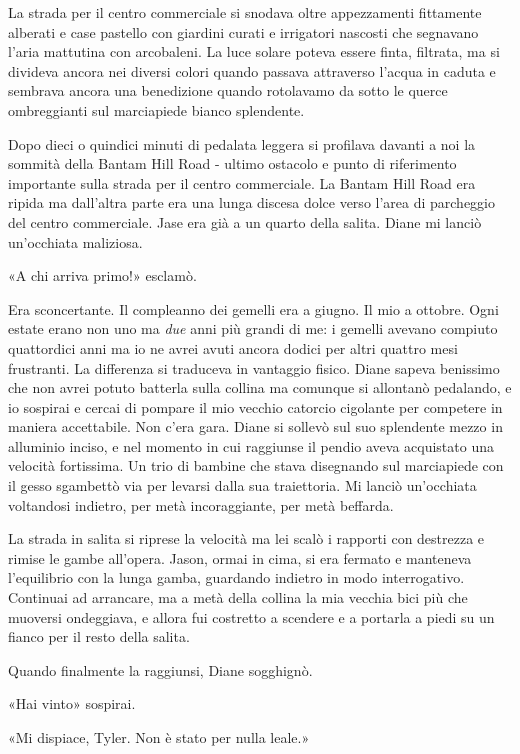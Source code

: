 La strada per il centro commerciale si snodava oltre appezzamenti
fittamente alberati e case pastello con giardini curati e irrigatori
nascosti che segnavano l'aria mattutina con arcobaleni. La luce solare
poteva essere finta, filtrata, ma si divideva ancora nei diversi colori
quando passava attraverso l'acqua in caduta e sembrava ancora una
benedizione quando rotolavamo da sotto le querce ombreggianti sul
marciapiede bianco splendente.

Dopo dieci o quindici minuti di pedalata leggera si profilava davanti a
noi la sommità della Bantam Hill Road - ultimo ostacolo e punto di
riferimento importante sulla strada per il centro commerciale. La Bantam
Hill Road era ripida ma dall'altra parte era una lunga discesa dolce
verso l'area di parcheggio del centro commerciale. Jase era già a un
quarto della salita. Diane mi lanciò un'occhiata maliziosa.

«A chi arriva primo!» esclamò.

Era sconcertante. Il compleanno dei gemelli era a giugno. Il mio a
ottobre. Ogni estate erano non uno ma \emph{due} anni più grandi di me:
i gemelli avevano compiuto quattordici anni ma io ne avrei avuti ancora
dodici per altri quattro mesi frustranti. La differenza si traduceva in
vantaggio fisico. Diane sapeva benissimo che non avrei potuto batterla
sulla collina ma comunque si allontanò pedalando, e io sospirai e cercai
di pompare il mio vecchio catorcio cigolante per competere in maniera
accettabile. Non c'era gara. Diane si sollevò sul suo splendente mezzo
in alluminio inciso, e nel momento in cui raggiunse il pendio aveva
acquistato una velocità fortissima. Un trio di bambine che stava
disegnando sul marciapiede con il gesso sgambettò via per levarsi dalla
sua traiettoria. Mi lanciò un'occhiata voltandosi indietro, per metà
incoraggiante, per metà beffarda.

La strada in salita si riprese la velocità ma lei scalò i rapporti con
destrezza e rimise le gambe all'opera. Jason, ormai in cima, si era
fermato e manteneva l'equilibrio con la lunga gamba, guardando indietro
in modo interrogativo. Continuai ad arrancare, ma a metà della collina
la mia vecchia bici più che muoversi ondeggiava, e allora fui costretto
a scendere e a portarla a piedi su un fianco per il resto della salita.

Quando finalmente la raggiunsi, Diane sogghignò.

«Hai vinto» sospirai.

«Mi dispiace, Tyler. Non è stato per nulla leale.»

